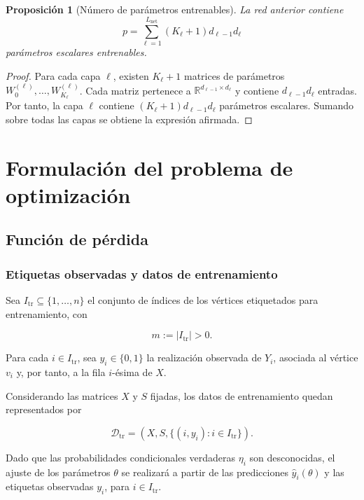 \documentclass[a4paper,openany,oneside,10pt]{report}
\theoremstyle{pnlTeorema}
\newtheorem{proposicion}{Proposición}[section]
\theoremstyle{pnlDefinicion}
\theoremstyle{pnlObservacion}
\begin{document}
\begin{proposicion}[Número de parámetros entrenables]
\label{prop:gcnn-parametros}
La red anterior contiene
\[
p=\sum_{\ell=1}^{L_{\mathrm{net}}}(K_\ell+1)d_{\ell-1}d_\ell
\]
parámetros escalares entrenables.
\end{proposicion}

\begin{proof}
Para cada capa $\ell$, existen $K_\ell+1$ matrices de parámetros $W_0^{(\ell)},\ldots,W_{K_\ell}^{(\ell)}$. Cada matriz pertenece a $\mathbb R^{d_{\ell-1}\times d_\ell}$ y contiene $d_{\ell-1}d_\ell$ entradas. Por tanto, la capa $\ell$ contiene $(K_\ell+1)d_{\ell-1}d_\ell$ parámetros escalares. Sumando sobre todas las capas se obtiene la expresión afirmada.
\end{proof}

\chapter{Formulación del problema de optimización}

\section{Función de pérdida}\label{sec:funcion-perdida}

\subsection{Etiquetas observadas y datos de entrenamiento}

Sea $I_{\mathrm{tr}}\subseteq\{1,\ldots,n\}$ el conjunto de índices de los vértices etiquetados para entrenamiento, con

\[
m:=|I_{\mathrm{tr}}|>0.
\]

Para cada $i\in I_{\mathrm{tr}}$, sea $y_i\in\{0,1\}$ la realización observada de $Y_i$, asociada al vértice $v_i$ y, por tanto, a la fila $i$-ésima de $X$.

Considerando las matrices $X$ y $S$ fijadas, los datos de entrenamiento quedan representados por

\[
\boxed{
\mathcal D_{\mathrm{tr}}
=
\left(X,S,\{(i,y_i):i\in I_{\mathrm{tr}}\}\right).
}
\]

Dado que las probabilidades condicionales verdaderas $\eta_i$ son desconocidas, el ajuste de los parámetros $\theta$ se realizará a partir de las predicciones $\hat y_i(\theta)$ y las etiquetas observadas $y_i$, para $i\in I_{\mathrm{tr}}$.
\end{document}
